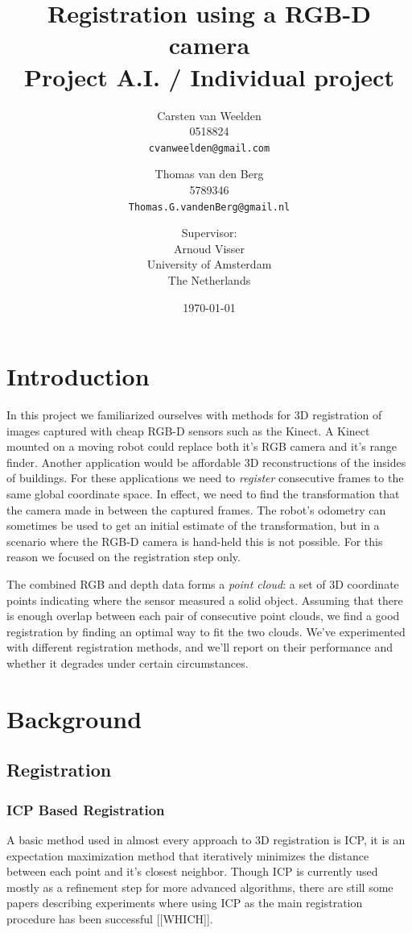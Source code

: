 \documentclass[a4paper]{article}
\title{Registration using a RGB-D camera\\
{\large Project A.I. / Individual project}}
\author{Carsten van Weelden \\ 0518824 \\ \texttt{cvanweelden@gmail.com} \and Thomas van den Berg \\ 5789346 \\ \texttt{Thomas.G.vandenBerg@gmail.nl} \and
 \small{Supervisor:} \\ Arnoud Visser \\ University of Amsterdam\\
  The Netherlands}
\date{\today}
\begin{document}
\maketitle

\section{Introduction}

In this project we familiarized ourselves with methods for 3D registration of images captured with cheap RGB-D sensors such as the Kinect. A Kinect mounted on a moving robot could replace both it's RGB camera and it's range finder. Another application would be affordable 3D reconstructions of the insides of buildings. For these applications we need to \emph{register} consecutive frames to the same global coordinate space. In effect, we need to find the transformation that the camera made in between the captured frames. The robot's odometry can sometimes be used to get an initial estimate of the transformation, but in a scenario where the RGB-D camera is hand-held this is not possible. For this reason we focused on the registration step only. 

The combined RGB and depth data forms a \emph{point cloud}: a set of 3D coordinate points indicating where the sensor measured a solid object. Assuming that there is enough overlap between each pair of consecutive point clouds, we find a good registration by finding an optimal way to fit the two clouds. We've experimented with different registration methods, and we'll report on their performance and whether it degrades under certain circumstances.

\section{Background}

\subsection{Registration}

\subsubsection{ICP Based Registration}

A basic method used in almost every approach to 3D registration is \ac{ICP}\cite{besl1992method}, it is an expectation maximization method that iteratively minimizes the distance between each point and it's closest neighbor. Though \ac{ICP} is currently used mostly as a refinement step for more advanced algorithms, there are still some papers describing experiments where using \ac{ICP} as the main registration procedure has been successful [[WHICH]]. 
\end{document}
